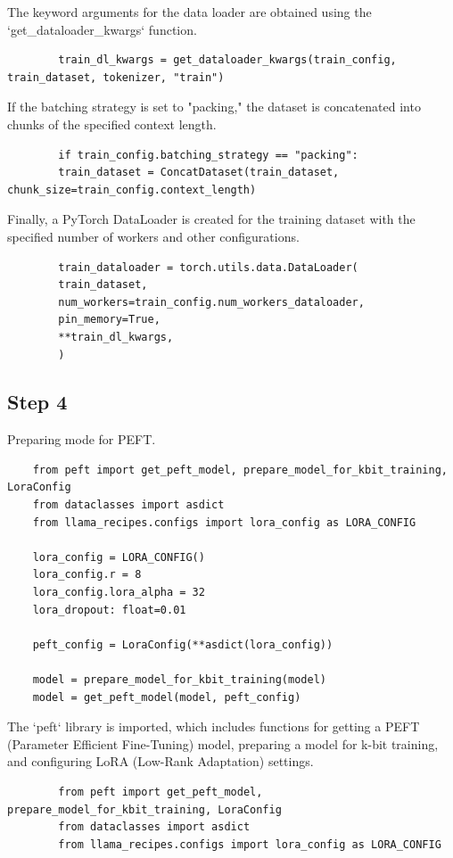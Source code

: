 \documentclass{solutionclass} %
\begin{document}
\begin{solution}
	The keyword arguments for the data loader are obtained using the `get\_dataloader\_kwargs` function.
	\begin{lstlisting}
		train_dl_kwargs = get_dataloader_kwargs(train_config, train_dataset, tokenizer, "train")
	\end{lstlisting}
\end{solution}

\begin{solution}
	If the batching strategy is set to "packing," the dataset is concatenated into chunks of the specified context length.
	\begin{lstlisting}
		if train_config.batching_strategy == "packing":
		train_dataset = ConcatDataset(train_dataset, chunk_size=train_config.context_length)
	\end{lstlisting}
\end{solution}

\begin{solution}
	Finally, a PyTorch DataLoader is created for the training dataset with the specified number of workers and other configurations.
	\begin{lstlisting}
		train_dataloader = torch.utils.data.DataLoader(
		train_dataset,
		num_workers=train_config.num_workers_dataloader,
		pin_memory=True,
		**train_dl_kwargs,
		)
	\end{lstlisting}
	
\end{solution}

\subsection*{Step 4}

Preparing mode for PEFT.

\begin{lstlisting}
	from peft import get_peft_model, prepare_model_for_kbit_training, LoraConfig
	from dataclasses import asdict
	from llama_recipes.configs import lora_config as LORA_CONFIG
	
	lora_config = LORA_CONFIG()
	lora_config.r = 8
	lora_config.lora_alpha = 32
	lora_dropout: float=0.01
	
	peft_config = LoraConfig(**asdict(lora_config))
	
	model = prepare_model_for_kbit_training(model)
	model = get_peft_model(model, peft_config)
\end{lstlisting}


\begin{solution}
	The `peft` library is imported, which includes functions for getting a PEFT (Parameter Efficient Fine-Tuning) model, preparing a model for k-bit training, and configuring LoRA (Low-Rank Adaptation) settings.
	\begin{lstlisting}
		from peft import get_peft_model, prepare_model_for_kbit_training, LoraConfig
		from dataclasses import asdict
		from llama_recipes.configs import lora_config as LORA_CONFIG
	\end{lstlisting}
\end{solution}
\end{document}
